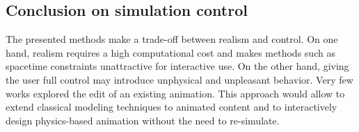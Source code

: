 \subsection{Conclusion on simulation control}

The presented methods make a trade-off between realism and control.
On one hand, realism requires a high computational cost and makes methods such as spacetime constraints unattractive for interactive use.
On the other hand, giving the user full control may introduce unphysical and unpleasant behavior.
Very few works explored the edit of an existing animation. 
This approach would allow to extend classical modeling techniques to animated content and to interactively design physics-based animation without the need to re-simulate.
